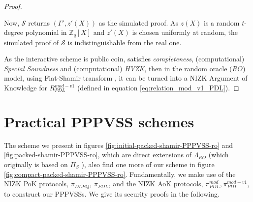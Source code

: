 \begin{proof}
\begin{itemize}
      Now, $\mathcal{S}$ returns $(\Gamma',z'(X))$ as the simulated proof. As $z(X)$ is a random $t$-degree polynomial in $\mathbb{Z}_q[X]$ and 
      $z'(X)$ is chosen uniformly at random, the simulated proof of $\mathcal{S}$ is indistinguishable from the real one.
  \end{itemize}
  As the interactive scheme is public coin, satisfies \textit{completeness}, (computational) \textit{Special Soundness} 
  and (computational) \textit{HVZK}, then in the random oracle ($RO$) model, using Fiat-Shamir transform \cite{10.1007/3-540-47721-7_12}, 
  it can be turned into a NIZK Argument of Knowledge for $R_{PDL}^{mod-v1}$ (defined in equation \ref{eq:relation_mod_v1_PDL}).
\end{proof}


\section{Practical PPPVSS schemes}

The scheme we present in figures \ref{fig:initial-packed-shamir-PPPVSS-ro} and \ref{fig:packed-shamir-PPPVSS-ro}, which are direct extensions of $\Lambda_{RO}$ \cite{cryptoeprint:2025/576} 
(which originally is based on $\Pi_S$ \cite{cryptoeprint:2023/1669}), also find one more of our scheme in 
figure \ref{fig:compact-packed-shamir-PPPVSS-ro}. Fundamentally, we make use of the NIZK 
PoK protocols, $\pi_{DLEQ}$, $\pi_{PDL}$, and the NIZK AoK protocols, $\pi_{PDL}^{mod},\pi_{PDL}^{mod-v1}$, to construct our PPPVSSs. We give its security proofs in the following. 







